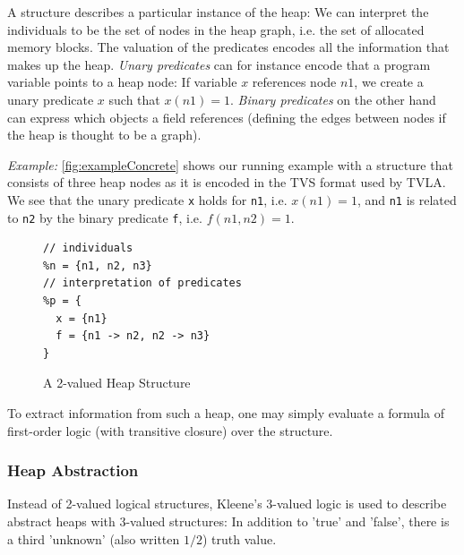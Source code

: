 \documentclass[11pt,a4paper,english]{article}
\begin{document}
A structure describes a particular instance of the heap: We can interpret the
individuals to be the set of nodes in the heap graph, i.e. the set of allocated
memory blocks. The valuation of the predicates encodes all the information that
makes up the heap. \textit{Unary predicates} can for instance encode that a
program variable points to a heap node: If variable $x$ references node $n1$, we
create a unary predicate $x$ such that $x(n1) = 1$. \textit{Binary predicates} on the
other hand can express which objects a field references (defining the edges
between nodes if the heap is thought to be a graph).

\textit{Example: } \autoref{fig:exampleConcrete} shows our running example with
a structure that consists of three heap nodes as it is encoded in the TVS format
used by TVLA. We see that the unary predicate \texttt{x} holds for \texttt{n1},
i.e. $x(n1) = 1$, and \texttt{n1} is related to \texttt{n2} by the binary
predicate \texttt{f}, i.e.  $f(n1,n2) = 1$.

\begin{figure}[h]
  \begin{lrbox}{\mylistingbox}
\begin{minipage}[b]{.45\linewidth}
\begin{lstlisting}[boxpos=b,language=tvs,label=lst:exampleConcrete]
// individuals
%n = {n1, n2, n3}
// interpretation of predicates
%p = {  
  x = {n1}
  f = {n1 -> n2, n2 -> n3}
}
\end{lstlisting}
\end{minipage}
  \end{lrbox}
  \hspace{1cm}
  \caption{A 2-valued Heap Structure}
  \label{fig:exampleConcrete}
\end{figure}
To extract information from such a heap, one may simply evaluate a formula of
first-order logic (with transitive closure) over the structure.

\subsubsection{Heap Abstraction} 
Instead of 2-valued logical structures, Kleene's 3-valued logic is used to
describe abstract heaps with 3-valued structures: In addition to 'true' and
'false', there is a third 'unknown' (also written $1/2$) truth value.  
\end{document}
